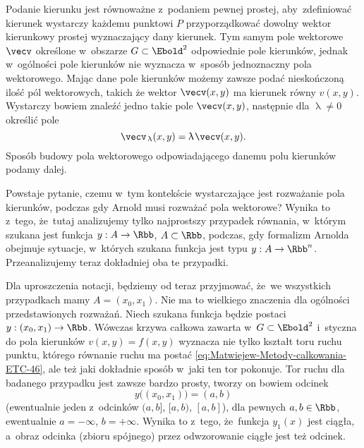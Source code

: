 \documentclass[a4paper,11pt]{article}
\numberwithin{equation}{section}
\renewcommand{\lambda}{\uplambda}
\begin{document}
Podanie kierunku jest równoważne z~podaniem pewnej prostej, aby~zdefiniować
kierunek wystarczy każdemu punktowi $P$ przyporządkować dowolny wektor
kierunkowy prostej wyznaczający dany kierunek. Tym samym pole wektorowe
$\vecv$ określone w~obszarze $G \subset \Ebold^{ 2 }$ odpowiednie pole kierunków,
jednak w~ogólności pole kierunków nie wyznacza w~sposób jednoznaczny pola
wektorowego. Mając dane pole kierunków możemy zawsze podać nieskończoną
ilość pól wektorowych, takich że wektor $\vecv( x, y )$ ma kierunek równy
$v( x, y )$. Wystarczy bowiem znaleźć jedno takie pole $\vecv( x, y )$,
następnie dla $\lambda \neq 0$ określić pole
\begin{equation}
  \label{eq:Uwagi-do-konkrentych-stron-28}
  \vecv_{ \, \lambda }( x, y ) = \lambda \HorSpaceThree \vecv( x, y ).
\end{equation}
Sposób budowy pola wektorowego odpowiadającego danemu polu kierunków podamy
dalej.

Powstaje pytanie, czemu w~tym kontekście wystarczające jest rozważanie pola
kierunków, podczas gdy Arnold musi rozważać pola wektorowe? Wynika to
z~tego, że~tutaj analizujemy tylko najprostszy przypadek równania, w~którym
szukana jest funkcja $y : A \to \Rbb$, $A \subset \Rbb$, podczas, gdy formalizm
Arnolda obejmuje sytuacje, w~których szukana funkcja jest typu
$y : A \to \Rbb^{ n }$. Przeanalizujemy teraz dokładniej oba te przypadki.

Dla uproszczenia notacji, będziemy od teraz przyjmować, że~we wszystkich
przypadkach mamy $A = ( x_{ 0 }, x_{ 1 } )$. Nie ma to wielkiego znaczenia
dla ogólności przedstawionych rozważań. Niech szukana funkcja będzie postaci
$y : ( x_{ 0 }, x_{ 1 } ) \to \Rbb$. Wówczas krzywa całkowa
zawarta w~$G \subset \Ebold^{ 2 }$ i~styczna do pola kierunków
$v( x, y ) = f( x, y )$ wyznacza nie tylko kształt toru ruchu punktu,
którego równanie ruchu ma postać
\eqref{eq:Matwiejew-Metody-calkowania-ETC-46},
ale też jaki dokładnie sposób w~jaki ten tor pokonuje. Tor ruchu dla
badanego przypadku jest zawsze bardzo prosty, tworzy on bowiem odcinek
\begin{equation}
  \label{eq:Uwagi-do-konkrentych-stron-29}
  y\big( ( x_{ 0 }, x_{ 1 } ) \big) = ( a, b )
\end{equation}
 (ewentualnie jeden z~odcinków
$( a, b ]$, $[ a, b )$, $[ a, b ]$), dla pewnych $a, b \in \Rbb$,
ewentualnie $a = -\infty$, $b = +\infty$. Wynika to z~tego, że~funkcja $y_{ 1 }( x )$
jest ciągła, a~obraz odcinka (zbioru spójnego) przez odwzorowanie ciągłe
jest też odcinek.
\end{document}
